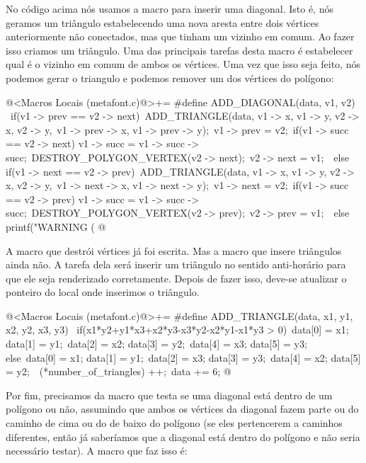 {{{{{{No código acima nós usamos a macro  para
inserir uma diagonal. Isto é, nós geramos um triângulo estabelecendo
uma nova aresta entre dois vértices anteriormente não conectados, mas
que tinham um vizinho em comum. Ao fazer isso criamos um
triângulo. Uma das principais tarefas desta macro é estabelecer qual é
o vizinho em comum de ambos os vértices. Uma vez que isso seja feito,
nós podemos gerar o triangulo e podemos remover um dos vértices do
polígono:

\iniciocodigo
@<Macros Locais (metafont.c)@>+=
#define ADD_DIAGONAL(data, v1, v2) \
        if(v1 -> prev == v2 -> next){\
          ADD_TRIANGLE(data, v1 -> x, v1 -> y, v2 -> x, v2 -> y,\
                       v1 -> prev -> x, v1 -> prev -> y);\
          v1 -> prev = v2;\
          if(v1 -> succ == v2 -> next) v1 -> succ = v1 -> succ -> succ;\
          DESTROY_POLYGON_VERTEX(v2 -> next);\
          v2 -> next = v1;\
        }\
        else if(v1 -> next == v2 -> prev){\
          ADD_TRIANGLE(data, v1 -> x, v1 -> y, v2 -> x, v2 -> y,\
                       v1 -> next -> x, v1 -> next -> y);\
          v1 -> next = v2;\
          if(v1 -> succ == v2 -> prev) v1 -> succ = v1 -> succ -> succ;\
          DESTROY_POLYGON_VERTEX(v2 -> prev);\
          v2 -> prev = v1;\
        }\
        else printf("WARNING (%
@
\fimcodigo

A macro que destrói vértices já foi escrita. Mas a macro que insere
triângulos ainda não. A tarefa dela será inserir um triângulo no
sentido anti-horário para que ele seja renderizado
corretamente. Depois de fazer isso, deve-se atualizar o ponteiro do
local onde inserimos o triângulo.

\iniciocodigo
@<Macros Locais (metafont.c)@>+=
#define ADD_TRIANGLE(data, x1, y1, x2, y2, x3, y3) \
  if(x1*y2+y1*x3+x2*y3-x3*y2-x2*y1-x1*y3 > 0){\
    data[0] = x1; data[1] = y1;\
    data[2] = x2; data[3] = y2;\
    data[4] = x3; data[5] = y3;\
  } else{\
    data[0] = x1; data[1] = y1;\
    data[2] = x3; data[3] = y3;\
    data[4] = x2; data[5] = y2;\
  }\
  (*number_of_triangles) ++;\
  data += 6;
@
\fimcodigo

Por fim, precisamos da macro que testa se uma diagonal está dentro de
um polígono ou não, assumindo que ambos os vértices da diagonal fazem
parte ou do caminho de cima ou do de baixo do polígono (se eles
pertencerem a caminhos diferentes, então já saberíamos que a diagonal
está dentro do polígono e não seria necessário testar). A macro que
faz isso é:

}}}}}}
